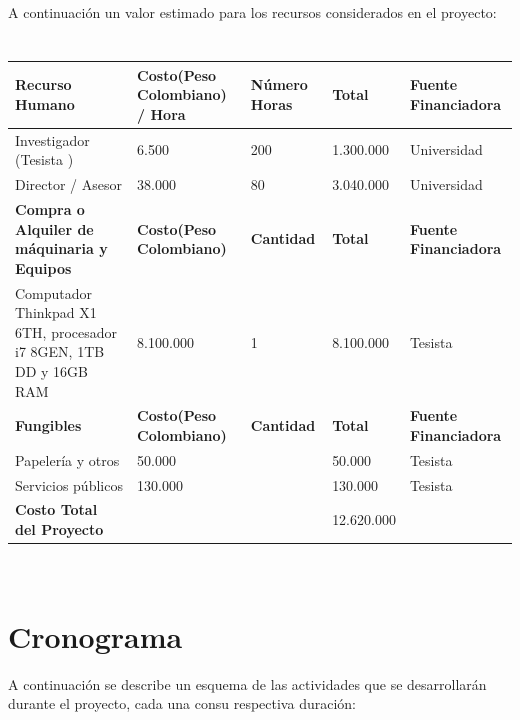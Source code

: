 \documentclass[letterpaper, 12pt, oneside]{article}
\begin{document}
	A continuación un valor estimado para los recursos considerados en el proyecto:
	\begin{table}[t]
    \centering
    \begin{tabular}{}
    \end{tabular}
    \caption{}
    \label{tab:label}
    \end{table}

	\begin{center}
    \begin{tabular}{|p{2.5cm}|p{3cm}|p{2cm}|p{2cm}|p{3cm}|}
    \hline
    \textbf{Recurso Humano} & \textbf{Costo(Peso Colombiano) / Hora } & \textbf{Número Horas} & \textbf{Total} & \textbf{Fuente Financiadora} \\
    \hline
    Investigador (Tesista   ) & 6.500 & 200 & 1.300.000 & Universidad \\
    \hline    \hline
    Director / Asesor & 38.000 & 80 & 3.040.000 & Universidad \\
    \hline
    \textbf{Compra o Alquiler de máquinaria y Equipos} & \textbf{Costo(Peso Colombiano) } & \textbf{Cantidad} & \textbf{Total} & \textbf{Fuente Financiadora} \\
    \hline
    Computador Thinkpad X1 6TH, procesador i7 8GEN, 1TB DD y 16GB RAM & 8.100.000 & 1 & 8.100.000 & Tesista  \\
    \hline

    \textbf{Fungibles} & \textbf{Costo(Peso Colombiano) } & \textbf{Cantidad} & \textbf{Total} & \textbf{Fuente Financiadora} \\
    \hline
    Papelería y otros & 50.000 &  & 50.000 & Tesista \\
    \hline
    Servicios públicos & 130.000 &  & 130.000 & Tesista  \\
    \hline
    \textbf{Costo Total del Proyecto} &  &  & 12.620.000 &  \\
    \hline
    \end{tabular}

    \end{center}\\
    
   
    
    \section{Cronograma}
    A continuación se describe un esquema de las actividades que se desarrollarán durante el proyecto, cada una consu respectiva duración:
    
\end{document}
